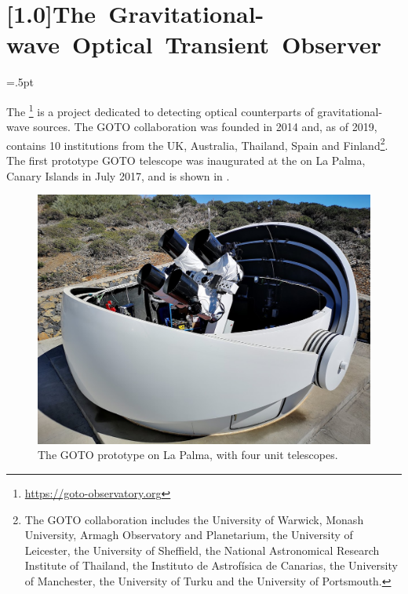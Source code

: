 \hfuzz=6pt %
\section[The Gravitational-wave Optical Transient Observer]{%
    \protect\scalebox{0.93}[1.0]{\mbox{The Gravitational-wave Optical Transient Observer}}
}
\hfuzz=.5pt %
\label{sec:goto}


\begin{colsection}

The \footnote{\url{https://goto-observatory.org}} is a project dedicated to detecting optical counterparts of gravitational-wave sources. The GOTO collaboration was founded in 2014 and, as of 2019, contains 10 institutions from the UK, Australia, Thailand, Spain and Finland\footnote{The GOTO collaboration includes the University of Warwick, Monash University, Armagh Observatory and Planetarium, the University of Leicester, the University of Sheffield, the National Astronomical Research Institute of Thailand, the Instituto de Astrofísica de Canarias, the University of Manchester, the University of Turku and the University of Portsmouth.}. The first prototype GOTO telescope was inaugurated at the  on La Palma, Canary Islands in July 2017, and is shown in .

\begin{figure}[p]
    \begin{center}
        \includegraphics[width=0.9\linewidth]{images/goto_photo.jpg}
    \end{center}
    \caption[The GOTO prototype on La Palma]{
        The GOTO prototype on La Palma, with four unit telescopes.
    }\label{fig:goto_photo}
\end{figure}


\end{colsection}
